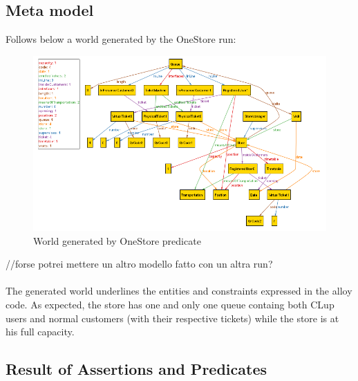 \documentclass[]{article}
\begin{document}
	
	
	
	\subsection{Meta model}

	Follows below a world generated by the OneStore run:
	
	\begin{figure}[H]
								\centering
								\includegraphics[scale=1.038]{OneStore.png}
								\caption{World generated by OneStore predicate}
	\end{figure}
	
	//forse potrei mettere un altro modello fatto con un altra run? \\ \\
	The generated world underlines the entities and constraints expressed in the alloy code. \newline
	As expected, the store has one and only one queue containg both CLup users and normal customers (with their respective tickets) while the store is at his full capacity.
	
	\subsection{Result of Assertions and Predicates}
	
\end{document}
